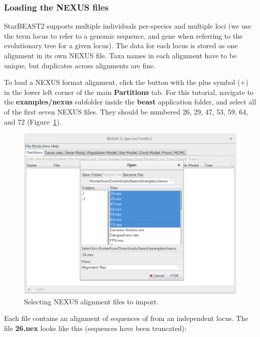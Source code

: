 \documentclass{article}
\begin{document}
\clearpage

\subsubsection*{Loading the NEXUS files}

StarBEAST2 supports multiple individuals per-species and multiple loci (we use
the term locus to refer to a genomic sequence, and gene when referring to the
evolutionary tree for a given locus). The data for each locus is stored as one
alignment in its own NEXUS file. Taxa names in each alignment have to be unique,
but duplicates across alignments are fine.

To load a NEXUS format alignment, click the button with the plus symbol ($+$) in
the lower left corner of the main \textbf{Partitions} tab. For this tutorial,
navigate to the \textbf{examples/nexus} subfolder inside the \textbf{beast}
application folder, and select all of the first seven NEXUS files. They should
be numbered 26, 29, 47, 53, 59, 64, and 72 (Figure~\ref{fig:importAlignments}).

\begin{figure}[htb!]
\centering
\includegraphics[width=\textwidth]{figures/beauti-import.png}
\caption{Selecting NEXUS alignment files to import.}
\label{fig:importAlignments}
\end{figure}

\clearpage

Each file contains an alignment of sequences of from an independent locus. The
file \textbf{26.nex} looks like this (sequences have been truncated):
\end{document}
